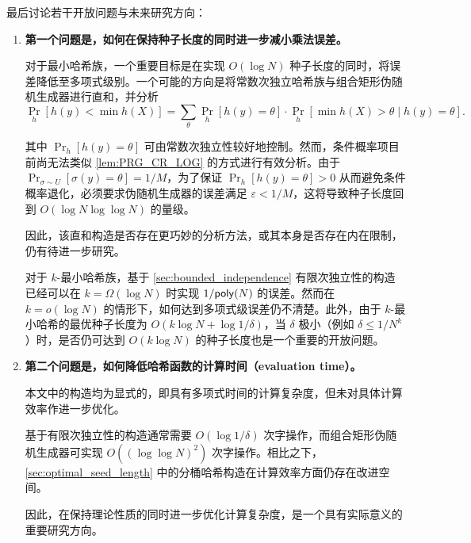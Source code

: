最后讨论若干开放问题与未来研究方向：
\begin{enumerate}
    \item \textbf{第一个问题是，如何在保持种子长度的同时进一步减小乘法误差。}
    
    对于最小哈希族，一个重要目标是在实现 $O(\log N)$ 种子长度的同时，将误差降低至多项式级别。一个可能的方向是将常数次独立哈希族与组合矩形伪随机生成器进行直和，并分析
    $$
    \Pr_h[h(y) < \min h(X)] 
    = \sum_\theta \Pr_h[h(y) = \theta] \cdot \Pr_h[\min h(X) > \theta \mid h(y) = \theta].
    $$

    其中 $\Pr_h[h(y) = \theta]$ 可由常数次独立性较好地控制。然而，条件概率项目前尚无法类似 \cref{lem:PRG_CR_LOG} 的方式进行有效分析。由于 $\Pr_{\sigma \sim U}[\sigma(y) = \theta] = 1/M$，为了保证
    $\Pr_h[h(y) = \theta] > 0$ 从而避免条件概率退化，必须要求伪随机生成器的误差满足 $\varepsilon < 1/M$，这将导致种子长度回到 $O(\log N \log \log N)$ 的量级。

    因此，该直和构造是否存在更巧妙的分析方法，或其本身是否存在内在限制，仍有待进一步研究。

    对于 $k$-最小哈希族，基于 \ref{sec:bounded_independence} 有限次独立性的构造已经可以在 $k = \Omega(\log N)$ 时实现 $1/\mathsf{poly}(N)$ 的误差。然而在 $k = o(\log N)$ 的情形下，如何达到多项式级误差仍不清楚。此外，由于 $k$-最小哈希的最优种子长度为 $O(k \log N + \log 1 / \delta)$，当 $\delta$ 极小（例如 $\delta \le 1/N^k$）时，是否仍可达到 $O(k \log N)$ 的种子长度也是一个重要的开放问题。

    \item \textbf{第二个问题是，如何降低哈希函数的计算时间（evaluation time）。}
    
    本文中的构造均为显式的，即具有多项式时间的计算复杂度，但未对具体计算效率作进一步优化。

    基于有限次独立性的构造通常需要 $O(\log 1/\delta)$ 次字操作，而组合矩形伪随机生成器可实现 $O((\log \log N)^2)$ 次字操作。相比之下，\ref{sec:optimal_seed_length} 中的分桶哈希构造在计算效率方面仍存在改进空间。

    因此，在保持理论性质的同时进一步优化计算复杂度，是一个具有实际意义的重要研究方向。
\end{enumerate}